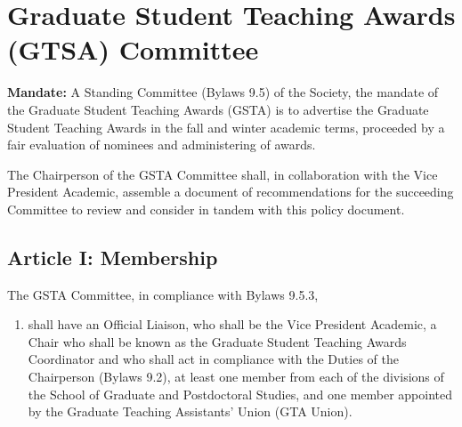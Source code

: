 \section{Graduate Student Teaching Awards (GTSA) Committee}

\textbf{Mandate:} A Standing Committee (Bylaws 9.5) of the Society, the mandate of the Graduate Student Teaching Awards (GSTA) is to advertise the Graduate Student Teaching Awards in the fall and winter academic terms, proceeded by a fair evaluation of nominees and administering of awards.\newline

The Chairperson of the GSTA Committee shall, in collaboration with the Vice President Academic, assemble a document of recommendations for the succeeding Committee to review and consider in tandem with this policy document. \newline

\subsection{Article I: Membership}   

The GSTA Committee, in compliance with Bylaws 9.5.3,
\begin{enumerate}

\item shall have an Official Liaison, who shall be the Vice President Academic, a Chair who shall be known as the Graduate Student Teaching Awards Coordinator and who shall act in compliance with the Duties of the Chairperson (Bylaws 9.2), at least one member from each of the divisions of the School of Graduate and Postdoctoral Studies, and one member appointed by the Graduate Teaching Assistants' Union (GTA Union).


\end{enumerate}

